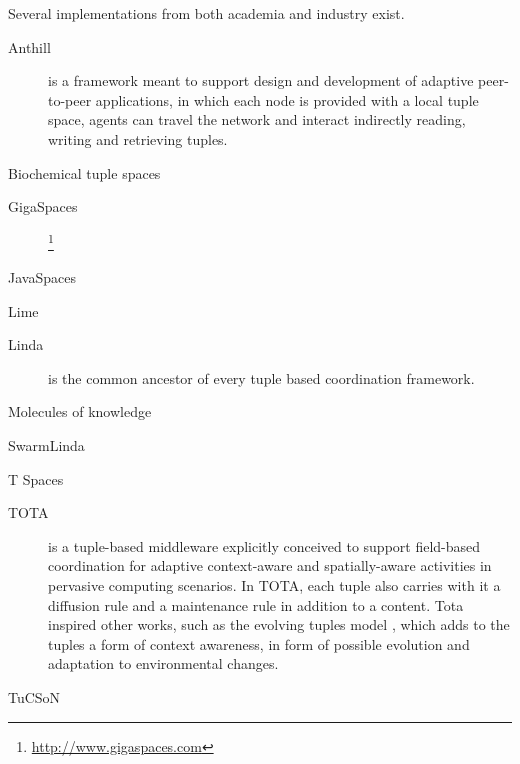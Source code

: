 \documentclass[12pt,a4paper,twoside,openright]{book}
\begin{document}
Several implementations from both academia and industry exist.

\begin{description}
 \item[Anthill] \cite{anthill} is a framework meant to support design and development of adaptive peer-to-peer applications, in which each node is provided with a local tuple space, agents can travel the network and interact indirectly reading, writing and retrieving tuples.

 \item[Biochemical tuple spaces] \cite{biochemicalTupleSpaces}

 \item[GigaSpaces]\footnote{\url{http://www.gigaspaces.com}}

 \item[JavaSpaces] \cite{javaspaces1999,javaspaces}

 \item[Lime] \cite{murphy2006lime}

 \item[Linda] \cite{linda-toplas7} is the common ancestor of every tuple based coordination framework.

 \item[Molecules of knowledge] \cite{mariani2013molecules}

 \item[SwarmLinda] \cite{swarmlinda}

 \item[T Spaces] \cite{tspaces-ibmsj37}

 \item[TOTA] \cite{mamei2009acm, tota2} is a tuple-based middleware explicitly conceived to support field-based coordination for adaptive context-aware and spatially-aware activities in pervasive computing scenarios.
 In TOTA, each tuple also carries with it a diffusion rule and a maintenance rule in addition to a content. Tota inspired other works, such as the evolving tuples model \cite{evolvingtuples}, which adds to the tuples a form of context awareness, in form of possible evolution and adaptation to environmental changes.

 \item[TuCSoN] \cite{tucson-aamas99}

\end{description}
\end{document}
